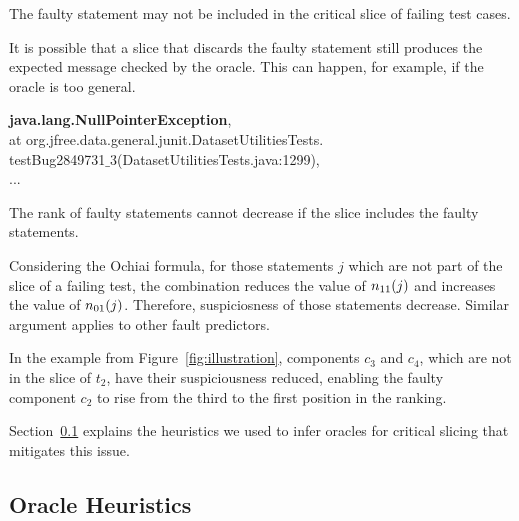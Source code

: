 \documentclass{article}
\begin{document}
\begin{theorem}
  The faulty statement may not be included in the critical slice of
  failing test cases.
\end{theorem}

It is possible that a slice that discards the faulty statement still
produces the expected message checked by the oracle. This can happen,
for example, if the oracle is too general.

\vspace{3mm}
\begin{myframe} \label{box:1}
\textbf{java.lang.NullPointerException}, \\
at org.jfree.data.general.junit.DatasetUtilitiesTests.\\
testBug2849731$\_$3(DatasetUtilitiesTests.java:1299), \\
...
\end{myframe}

\begin{theorem}
  The rank of faulty statements cannot decrease if the slice includes
  the faulty statements.
\end{theorem}

Considering the Ochiai formula, for those statements $j$ which are not
part of the slice of a failing test, the combination reduces the value
of $n_{11}(j)$ and increases the value of $n_{01}(j)$. Therefore,
suspiciosness of those statements decrease. Similar argument applies
to other fault predictors.

In the example from Figure~\ref{fig:illustration}, components $c_3$
and $c_4$, which are not in the slice of $t_2$, have their
suspiciousness reduced, enabling the faulty component $c_2$ to rise
from the third to the first position in the ranking.

Section~\ref{sec:oracleheuristics} explains the heuristics
we used to infer oracles for critical slicing that mitigates this
issue.

\subsection{Oracle Heuristics}
\label{sec:oracleheuristics}


\end{document}
